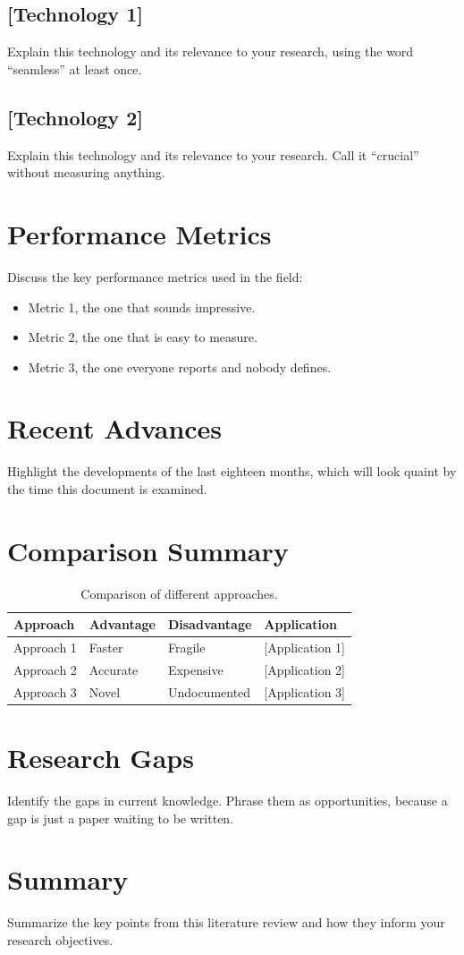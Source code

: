 \subsection{[Technology 1]}

Explain this technology and its relevance to your research, using the
word ``seamless'' at least once.

\subsection{[Technology 2]}

Explain this technology and its relevance to your research. Call it
``crucial'' without measuring anything.

\section{Performance Metrics}

Discuss the key performance metrics used in the field:

\begin{itemize}
  \item Metric 1, the one that sounds impressive.
  \item Metric 2, the one that is easy to measure.
  \item Metric 3, the one everyone reports and nobody defines.
\end{itemize}

\section{Recent Advances}

Highlight the developments of the last eighteen months, which will look
quaint by the time this document is examined.

\section{Comparison Summary}

\begin{table}[htbp]
  \centering
  \caption{Comparison of different approaches.}
  \label{tab:comparison}
  \begin{tabular}{l l l l}
    \toprule
    Approach & Advantage & Disadvantage & Application \\
    \midrule
    Approach 1 & Faster & Fragile & [Application 1] \\
    Approach 2 & Accurate & Expensive & [Application 2] \\
    Approach 3 & Novel & Undocumented & [Application 3] \\
    \bottomrule
  \end{tabular}
\end{table}

\section{Research Gaps}

Identify the gaps in current knowledge. Phrase them as opportunities,
because a gap is just a paper waiting to be written.

\section{Summary}

Summarize the key points from this literature review and how they
inform your research objectives.
